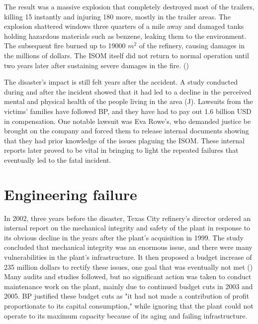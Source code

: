 \documentclass[12pt]{article}
\begin{document}
	The result was a massive explosion that completely destroyed most of the trailers, killing 15 instantly and injuring 180 more, mostly in the trailer areas. The explosion shattered windows three quarters of a mile away and damaged tanks holding hazardous materials such as benzene, leaking them to the environment. The subsequent fire burned up to 19000 $m^2$ of the refinery, causing damages in the millions of dollars. The ISOM itself did not return to normal operation until two years later after sustaining severe damages in the fire. (\cite{csbreport})
	
	The disaster's impact is still felt years after the accident. A study conducted during and after the incident showed that it had led to a decline in the perceived mental and physical health of the people living in the area (\cite{Peek106}J). Lawsuits from the victims' families have followed BP, and they have had to pay out 1.6 billion USD in compensation. One notable lawsuit was Eva Rowe's, who demanded justice be brought on the company and forced them to release internal documents showing that they had prior knowledge of the issues plaguing the ISOM. These internal reports later proved to be vital in bringing to light the repeated failures that eventually led to the fatal incident.

	\section*{Engineering failure}
	In 2002, three years before the disaster, Texas City refinery's director ordered an internal report on the mechanical integrity and safety of the plant in response to its obvious decline in the years after the plant's acquisition in 1999. The study concluded that mechanical integrity was an enormous issue, and there were many vulnerabilities in the plant's infrastructure. It then proposed a budget increase of 235 million dollars to rectify these issues, one goal that was eventually not met (\cite{csbreport}) Many audits and studies followed, but no significant action was taken to conduct maintenance work on the plant, mainly due to continued budget cuts in 2003 and 2005. BP justified these budget cuts as "it had not made a contribution of profit proportionate to its capital consumption," while ignoring that the plant could not operate to its maximum capacity because of its aging and failing infrastructure.
	
\end{document}
